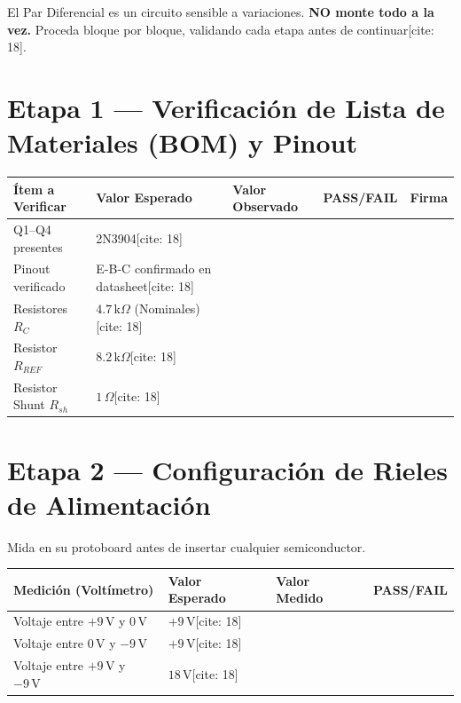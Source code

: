 \documentclass[11pt, a4paper]{article}
\begin{document}
\begin{tcolorbox}[colback=ucbblue!5, colframe=ucbblue, title=\textbf{Hito 2: Checklist de Construcción Escalonada}]
    El Par Diferencial es un circuito sensible a variaciones. \textbf{NO monte todo a la vez.} Proceda bloque por bloque, validando cada etapa antes de continuar[cite: 18].
\end{tcolorbox}

\section*{Etapa 1 — Verificación de Lista de Materiales (BOM) y Pinout}
\renewcommand{\arraystretch}{1.5}
\begin{tabularx}{\textwidth}{|>{\raggedright\arraybackslash}p{4cm}|>{\raggedright\arraybackslash}X|>{\centering\arraybackslash}X|>{\centering\arraybackslash}X|>{\centering\arraybackslash}X|}
\hline
\rowcolor{ucbblue!20}
\textbf{Ítem a Verificar} & \textbf{Valor Esperado} & \textbf{Valor Observado} & \textbf{PASS/FAIL} & \textbf{Firma} \\ \hline
Q1–Q4 presentes & 2N3904[cite: 18] & & & \\ \hline
Pinout verificado & E-B-C confirmado en datasheet[cite: 18] & & & \\ \hline
Resistores $R_C$ & $4.7\,\text{k}\Omega$ (Nominales)[cite: 18] & & & \\ \hline
Resistor $R_{REF}$ & $8.2\,\text{k}\Omega$[cite: 18] & & & \\ \hline
Resistor Shunt $R_{sh}$ & $1\,\Omega$[cite: 18] & & & \\ \hline
\end{tabularx}

\section*{Etapa 2 — Configuración de Rieles de Alimentación}
Mida en su protoboard antes de insertar cualquier semiconductor. \\
\begin{tabularx}{\textwidth}{|>{\raggedright\arraybackslash}p{5cm}|>{\raggedright\arraybackslash}X|>{\centering\arraybackslash}X|>{\centering\arraybackslash}X|}
\hline
\rowcolor{ucbblue!20}
\textbf{Medición (Voltímetro)} & \textbf{Valor Esperado} & \textbf{Valor Medido} & \textbf{PASS/FAIL} \\ \hline
Voltaje entre $+9\,\text{V}$ y $0\,\text{V}$ & $+9\,\text{V}$[cite: 18] & & \\ \hline
Voltaje entre $0\,\text{V}$ y $-9\,\text{V}$ & $+9\,\text{V}$[cite: 18] & & \\ \hline
Voltaje entre $+9\,\text{V}$ y $-9\,\text{V}$ & $18\,\text{V}$[cite: 18] & & \\ \hline
\end{tabularx}
\end{document}
